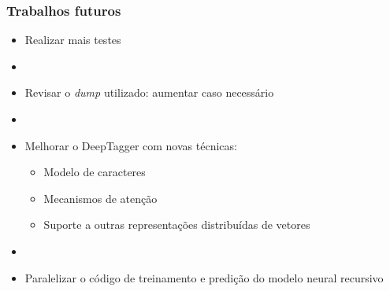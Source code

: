 \documentclass[10pt]{beamer}
\begin{document}
\begin{frame}[fragile]
  \frametitle{Trabalhos futuros}

  \begin{itemize}
    \item Realizar mais testes

    \item[\ ] \ 

    \item Revisar o \textit{dump} utilizado: aumentar caso necessário

    \item[\ ] \ 

    \item Melhorar o DeepTagger com novas técnicas:

    \begin{itemize}
      \item Modelo de caracteres

      \item Mecanismos de atenção

      \item Suporte a outras representações distribuídas de vetores
    \end{itemize}
    
    \item[\ ] \ 

    \item Paralelizar o código de treinamento e predição do modelo neural recursivo

  \end{itemize}


\end{frame}
\end{document}
